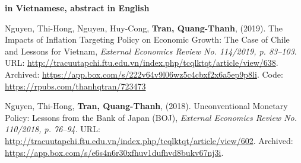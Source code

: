 {\bf in Vietnamese, abstract in English}
\vspace*{.05in}
\begin{etaremune}[]
	\item
	Nguyen, Thi-Hong,
	Nguyen, Huy-Cong,
	{\bf Tran, Quang-Thanh},
	(2019).
	{The Impacts of Inflation Targeting Policy on Economic Growth: The Case of Chile and Lessons for Vietnam},
	{\it External Economics Review No. 114/2019, p. 83--103}.
	{URL: \url{http://tracuutapchi.ftu.edu.vn/index.php/tcqlktqt/article/view/638}}.
	{Archived: \url{https://app.box.com/s/222v64v9l06wz5c4cbxf2x6a5ep9p8li}. Code: \url{https://rpubs.com/thanhqtran/723473}}

	\item 
	Nguyen, Thi-Hong,
	{\bf Tran, Quang-Thanh},
	(2018).
	Unconventional Monetary Policy: Lessons from the Bank of Japan (BOJ),
	{\it External Economics Review No. 110/2018, p. 76--94}.
	{URL: \url{http://tracuutapchi.ftu.edu.vn/index.php/tcqlktqt/article/view/602}}. 
	{Archived: \url{https://app.box.com/s/e6s4n6r30xfhuv1dufhvd8bukv67nj3i}}.
\end{etaremune}


